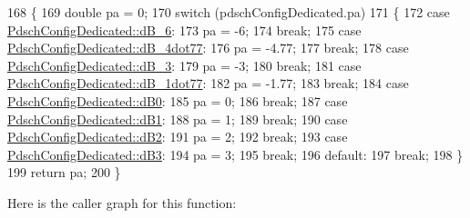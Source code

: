\begin{DoxyCode}
168   \{
169     \textcolor{keywordtype}{double} pa = 0;
170     \textcolor{keywordflow}{switch} (pdschConfigDedicated.pa)
171       \{
172       \textcolor{keywordflow}{case} \hyperlink{structns3_1_1LteRrcSap_1_1PdschConfigDedicated_ab578fcb68059ff534058eb5c67df7168a42399258b8b913f0a56c4e950354cbe3}{PdschConfigDedicated::dB\_6}:
173         pa = -6;
174         \textcolor{keywordflow}{break};
175       \textcolor{keywordflow}{case} \hyperlink{structns3_1_1LteRrcSap_1_1PdschConfigDedicated_ab578fcb68059ff534058eb5c67df7168ad1abcb4b289e226650368e4f93fe1fc8}{PdschConfigDedicated::dB\_4dot77}:
176         pa = -4.77;
177         \textcolor{keywordflow}{break};
178       \textcolor{keywordflow}{case} \hyperlink{structns3_1_1LteRrcSap_1_1PdschConfigDedicated_ab578fcb68059ff534058eb5c67df7168ad063207223326a9486eba1ce016865d9}{PdschConfigDedicated::dB\_3}:
179         pa = -3;
180         \textcolor{keywordflow}{break};
181       \textcolor{keywordflow}{case} \hyperlink{structns3_1_1LteRrcSap_1_1PdschConfigDedicated_ab578fcb68059ff534058eb5c67df7168a02259942327b99c5664d644aa58232a8}{PdschConfigDedicated::dB\_1dot77}:
182         pa = -1.77;
183         \textcolor{keywordflow}{break};
184       \textcolor{keywordflow}{case} \hyperlink{structns3_1_1LteRrcSap_1_1PdschConfigDedicated_ab578fcb68059ff534058eb5c67df7168ab2c88638c7d33e466151e88100a930d6}{PdschConfigDedicated::dB0}:
185         pa = 0;
186         \textcolor{keywordflow}{break};
187       \textcolor{keywordflow}{case} \hyperlink{structns3_1_1LteRrcSap_1_1PdschConfigDedicated_ab578fcb68059ff534058eb5c67df7168aa673d34261604d2117b2980842ca4cf4}{PdschConfigDedicated::dB1}:
188         pa = 1;
189         \textcolor{keywordflow}{break};
190       \textcolor{keywordflow}{case} \hyperlink{structns3_1_1LteRrcSap_1_1PdschConfigDedicated_ab578fcb68059ff534058eb5c67df7168abb102a537d21d1ba559d2eab80edc657}{PdschConfigDedicated::dB2}:
191         pa = 2;
192         \textcolor{keywordflow}{break};
193       \textcolor{keywordflow}{case} \hyperlink{structns3_1_1LteRrcSap_1_1PdschConfigDedicated_ab578fcb68059ff534058eb5c67df7168a72e02fab5b3134438e44150e2cf24c6e}{PdschConfigDedicated::dB3}:
194         pa = 3;
195         \textcolor{keywordflow}{break};
196       \textcolor{keywordflow}{default}:
197         \textcolor{keywordflow}{break};
198       \}
199     \textcolor{keywordflow}{return} pa;
200   \}
\end{DoxyCode}


Here is the caller graph for this function\+:




